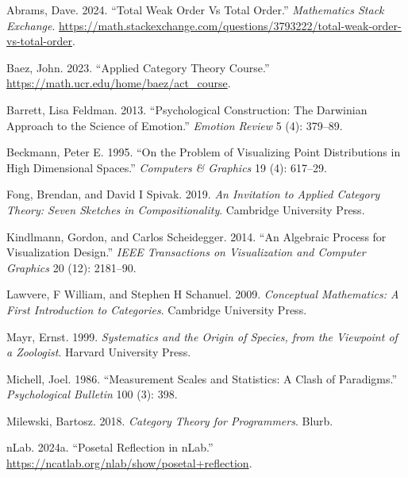 \documentclass[
]{book}
\newlength{\cslhangindent}
\newlength{\cslentryspacingunit} %
\newenvironment{CSLReferences}[2] %
 {%
  \setlength{\parindent}{0pt}
  \ifodd #1
  \let\oldpar\par
  \def\par{\hangindent=\cslhangindent\oldpar}
  \fi
  \setlength{\parskip}{#2\cslentryspacingunit}
 }%
 {}
\theoremstyle{definition}
\theoremstyle{definition}
\theoremstyle{definition}
\theoremstyle{definition}
\theoremstyle{remark}
\begin{document}
\hypertarget{refs}{}
\begin{CSLReferences}{1}{0}
\leavevmode{}%
Abrams, Dave. 2024. {``Total Weak Order Vs Total Order.''} \emph{Mathematics Stack Exchange}. \url{https://math.stackexchange.com/questions/3793222/total-weak-order-vs-total-order}.

\leavevmode{}%
Baez, John. 2023. {``{Applied Category Theory Course}.''} \url{https://math.ucr.edu/home/baez/act_course}.

\leavevmode{}%
Barrett, Lisa Feldman. 2013. {``Psychological Construction: The Darwinian Approach to the Science of Emotion.''} \emph{Emotion Review} 5 (4): 379--89.

\leavevmode{}%
Beckmann, Peter E. 1995. {``On the Problem of Visualizing Point Distributions in High Dimensional Spaces.''} \emph{Computers \& Graphics} 19 (4): 617--29.

\leavevmode{}%
Fong, Brendan, and David I Spivak. 2019. \emph{An Invitation to Applied Category Theory: Seven Sketches in Compositionality}. Cambridge University Press.

\leavevmode{}%
Kindlmann, Gordon, and Carlos Scheidegger. 2014. {``An Algebraic Process for Visualization Design.''} \emph{IEEE Transactions on Visualization and Computer Graphics} 20 (12): 2181--90.

\leavevmode{}%
Lawvere, F William, and Stephen H Schanuel. 2009. \emph{Conceptual Mathematics: A First Introduction to Categories}. Cambridge University Press.

\leavevmode{}%
Mayr, Ernst. 1999. \emph{Systematics and the Origin of Species, from the Viewpoint of a Zoologist}. Harvard University Press.

\leavevmode{}%
Michell, Joel. 1986. {``Measurement Scales and Statistics: A Clash of Paradigms.''} \emph{Psychological Bulletin} 100 (3): 398.

\leavevmode{}%
Milewski, Bartosz. 2018. \emph{Category Theory for Programmers}. Blurb.

\leavevmode{}%
nLab. 2024a. {``Posetal Reflection in nLab.''} \url{https://ncatlab.org/nlab/show/posetal+reflection}.


\end{CSLReferences}
\end{document}
